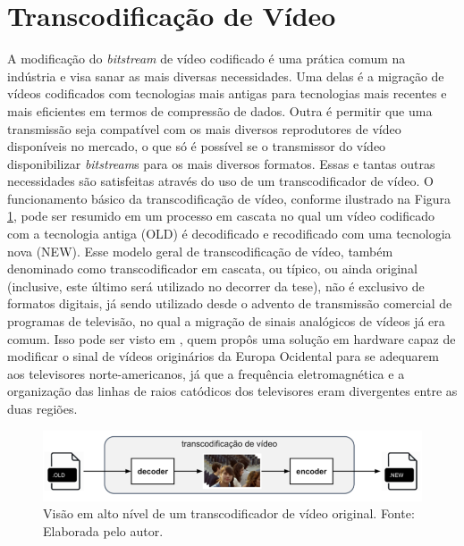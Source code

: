 \section{Transcodificação de Vídeo}
\label{cap:2.1}

A modificação do \textit{bitstream} de vídeo codificado é uma prática comum na indústria e visa sanar as mais diversas necessidades. Uma delas é a migração de vídeos codificados com tecnologias mais antigas para tecnologias mais recentes e mais eficientes em termos de compressão de dados. Outra é permitir que uma transmissão seja compatível com os mais diversos reprodutores de vídeo disponíveis no mercado, o que só é possível se o transmissor do vídeo disponibilizar \textit{bitstream}s para os mais diversos formatos. Essas e tantas outras necessidades são satisfeitas através do uso de um transcodificador de vídeo. O funcionamento básico da transcodificação de vídeo, conforme ilustrado na Figura \ref{fig:3}, pode ser resumido em um processo em cascata no qual um vídeo codificado com a tecnologia antiga (OLD) é decodificado e recodificado com uma tecnologia nova (NEW). Esse modelo geral de transcodificação de vídeo, também denominado como transcodificador em cascata, ou típico, ou ainda original (inclusive, este último será utilizado no decorrer da tese), não é exclusivo de formatos digitais, já sendo utilizado desde o advento de transmissão comercial de programas de televisão, no qual a migração de sinais analógicos de vídeos já era comum. Isso pode ser visto em \cite{bib:transcoding67}, quem propôs uma solução em hardware capaz de modificar o sinal de vídeos originários da Europa Ocidental para se adequarem aos televisores norte-americanos, já que a frequência eletromagnética e a organização das linhas de raios catódicos dos televisores eram divergentes entre as duas regiões.

\begin{figure}
    \centering
    \includegraphics[width=\textwidth]{FIGURES/fig_3.png}
    \caption{Visão em alto nível de um transcodificador de vídeo original. Fonte: Elaborada pelo autor.}
    \label{fig:3}
\end{figure}

